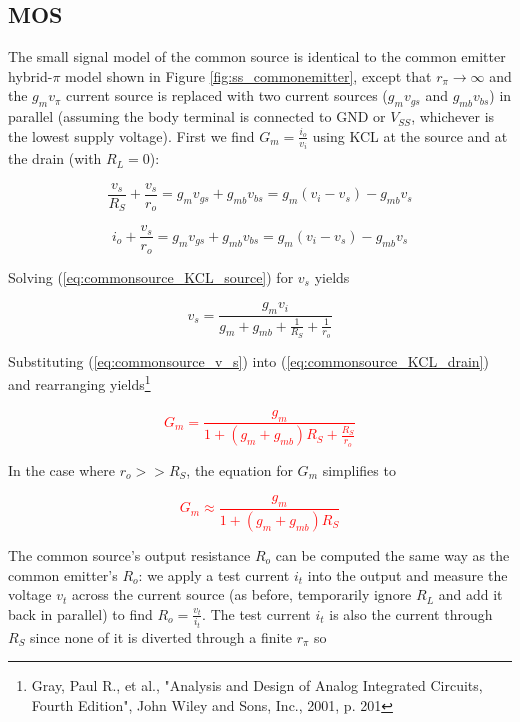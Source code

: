 \subsection{MOS}
The small signal model of the common source is identical to the common emitter hybrid-$\pi$ model shown in Figure \ref{fig:ss_commonemitter}, except that $r_{\pi} \rightarrow \infty$ and the $g_{m}v_{\pi}$ current source is replaced with two current sources ($g_{m}v_{gs}$ and $g_{mb}v_{bs}$) in parallel (assuming the body terminal is connected to GND or $V_{SS}$, whichever is the lowest supply voltage). First we find $G_{m} = \frac{i_{o}}{v_{i}}$ using KCL at the source and at the drain (with $R_{L} = 0$):

\begin{equation}
\frac{v_{s}}{R_{S}} + \frac{v_{s}}{r_{o}} = g_{m}v_{gs} + g_{mb}v_{bs} = g_{m}(v_{i}-v_{s}) - g_{mb}v_{s}
\label{eq:commonsource_KCL_source}
\end{equation}

\begin{equation}
i_{o} + \frac{v_{s}}{r_{o}} = g_{m}v_{gs} + g_{mb}v_{bs} = g_{m}(v_{i}-v_{s}) - g_{mb}v_{s}
\label{eq:commonsource_KCL_drain}
\end{equation}

\noindent Solving (\ref{eq:commonsource_KCL_source}) for $v_{s}$ yields

\begin{equation}
v_{s} = \frac{g_{m}v_{i}}{g_{m}+g_{mb}+\frac{1}{R_{S}}+\frac{1}{r_{o}}}
\label{eq:commonsource_v_s}
\end{equation}

\noindent Substituting (\ref{eq:commonsource_v_s}) into (\ref{eq:commonsource_KCL_drain}) and rearranging yields\footnote{Gray, Paul R., et al., "Analysis and Design of Analog Integrated Circuits, Fourth Edition", John Wiley and Sons, Inc., 2001, p. 201}

\textcolor{red}{
\begin{equation}
G_{m} = \frac{g_{m}}{1+(g_{m}+g_{mb})R_{S}+\frac{R_{S}}{r_{o}}}
\end{equation}
}

\noindent In the case where $r_{o} >> R_{S}$, the equation for $G_{m}$ simplifies to

\textcolor{red}{
\begin{equation}
G_{m} \approx \frac{g_{m}}{1+(g_{m}+g_{mb})R_{S}}
\end{equation}
}

The common source's output resistance $R_{o}$ can be computed the same way as the common emitter's $R_{o}$: we apply a test current $i_{t}$ into the output and measure the voltage $v_{t}$ across the current source (as before, temporarily ignore $R_{L}$ and add it back in parallel) to find $R_{o} = \frac{v_{t}}{i_{t}}$. The test current $i_{t}$ is also the current through $R_{S}$ since none of it is diverted through a finite $r_{\pi}$ so

